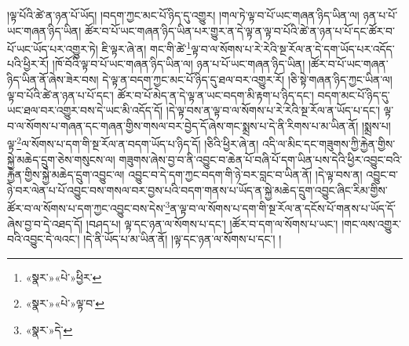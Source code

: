།ལྟ་པོའི་ཚེ་ན་ཉན་པོ་ཡོད། །བདག་ཀྱང་མང་པོ་ཉིད་དུ་འགྱུར། །གལ་ཏེ་ལྟ་བ་པོ་ཡང་གཞན་ཉིད་ཡིན་ལ། ཉན་པ་པོ་ཡང་གཞན་ཉིད་ཡིན། ཚོར་བ་པོ་ཡང་གཞན་ཉིད་ཡིན་པར་གྱུར་ན་དེ་ལྟ་ན་ལྟ་བ་པོའི་ཚེ་ན་ཉན་པ་པོ་དང་ཚོར་བ་པོ་ཡང་ཡོད་པར་འགྱུར་ཏེ། ཇི་ལྟར་ཞེ་ན། གང་གི་ཚེ་\footnote{«སྣར་»«པེ་»ཕྱིར་}ལྟ་བ་ལ་སོགས་པ་རེ་རེའི་སྔ་རོལ་ན་དེ་དག་ཡོད་པར་འདོད་པའི་ཕྱིར་རོ། །ཁོ་བོའི་ལྟ་བ་པོ་ཡང་གཞན་ཉིད་ཡིན་ལ། ཉན་པ་པོ་ཡང་གཞན་ཉིད་ཡིན། །ཚོར་བ་པོ་ཡང་གཞན་ཉིད་ཡིན་ནོ་ཞེས་ཟེར་བས། དེ་ལྟ་ན་བདག་ཀྱང་མང་པོ་ཉིད་དུ་ཐལ་བར་འགྱུར་རོ། །ཅི་སྟེ་གཞན་ཉིད་ཀྱང་ཡིན་ལ། ལྟ་བ་པོའི་ཚེ་ན་ཉན་པ་པོ་དང་། ཚོར་བ་པོ་མེད་ན་དེ་ལྟ་ན་ཡང་བདག་མི་རྟག་པ་ཉིད་དང་། བདག་མང་པོ་ཉིད་དུ་ཡང་ཐལ་བར་འགྱུར་བས་དེ་ཡང་མི་འདོད་དོ། །དེ་ལྟ་བས་ན་ལྟ་བ་ལ་སོགས་པ་རེ་རེའི་སྔ་རོལ་ན་ཡོད་པ་དང་། ལྟ་བ་ལ་སོགས་པ་གཞན་དང་གཞན་གྱིས་གསལ་བར་བྱེད་དོ་ཞེས་གང་སྨྲས་པ་དེ་ནི་རིགས་པ་མ་ཡིན་ནོ། །སྨྲས་པ། ལྟ་\footnote{«སྣར་»«པེ་»ལྟ་བ་}ལ་སོགས་པ་དག་གི་སྔ་རོལ་ན་བདག་ཡོད་པ་ཉིད་དོ། །ཅིའི་ཕྱིར་ཞེ་ན། འདི་ལ་མིང་དང་གཟུགས་ཀྱི་རྐྱེན་གྱིས་སྐྱེ་མཆེད་དྲུག་ཅེས་གསུངས་ལ། གཟུགས་ཞེས་བྱ་བ་ནི་འབྱུང་བ་ཆེན་པོ་བཞི་པོ་དག་ཡིན་པས་དེའི་ཕྱིར་འབྱུང་བའི་རྐྱེན་གྱིས་སྐྱེ་མཆེད་དྲུག་འབྱུང་ལ། འབྱུང་བ་དེ་དག་ཀྱང་བདག་གི་ཉེ་བར་བླང་བ་ཡིན་ནོ། །དེ་ལྟ་བས་ན། འབྱུང་བ་ཉེ་བར་ལེན་པ་པོ་འབྱུང་བས་གསལ་བར་བྱས་པའི་བདག་གནས་པ་ཡོད་ན་སྐྱེ་མཆེད་དྲུག་འབྱུང་ཞིང་རིམ་གྱིས་ཚོར་བ་ལ་སོགས་པ་དག་ཀྱང་འབྱུང་བས་དེས་\footnote{«སྣར་»དེ་}ན་ལྟ་བ་ལ་སོགས་པ་དག་གི་སྔ་རོལ་ན་དངོས་པོ་གནས་པ་ཡོད་དོ་ཞེས་བྱ་བ་དེ་འཐད་དོ། །བཤད་པ། ལྟ་དང་ཉན་ལ་སོགས་པ་དང་། །ཚོར་བ་དག་ལ་སོགས་པ་ཡང་། །གང་ལས་འགྱུར་བའི་འབྱུང་དེ་ལའང་། །དེ་ནི་ཡོད་པ་མ་ཡིན་ནོ། །ལྟ་དང་ཉན་ལ་སོགས་པ་དང་། །
